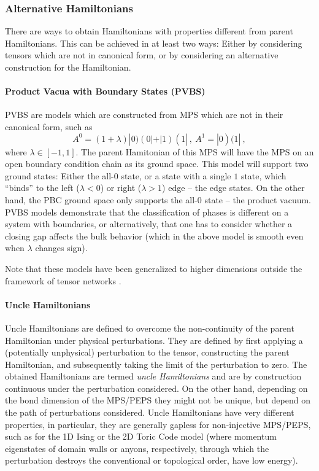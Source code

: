 \documentclass[rmp,aps,reprint,superscriptaddress,nobalancelastpage]{revtex4-1}
\begin{document}
\subsubsection{Alternative Hamiltonians}

There are ways to obtain Hamiltonians with properties different from parent Hamiltonians. This can be achieved in at least two ways: Either by considering tensors which are not in canonical form, or by considering an alternative construction for the Hamiltonian.

\paragraph{Product Vacua with Boundary States (PVBS)}
PVBS \cite{bachmann:pvbs-prb,bachmann:pvbs-cmp} are models which are constructed from MPS which are not in their canonical form, such as
$$
    A^0=(1+\lambda) |0)(0|+|1)(1|\,,\ A^1=|0)(1|\ ,
$$
where $\lambda\in[-1,1]$.
The parent Hamitonian of this MPS will have the MPS on an open boundary condition chain as its ground space.  This model will support two ground states: Either the all-$0$ state, or a state with a single $1$ state, which ``binds'' to the left ($\lambda<0$) or right ($\lambda>1$) edge -- the edge states. On the other hand, the PBC ground space only supports the all-$0$ state -- the product vacuum. PVBS models demonstrate that the classification of phases is different on a system with boundaries, or alternatively, that one has to consider whether a closing gap affects the bulk behavior (which in the above model is smooth even when $\lambda$ changes sign).

Note that these models have been generalized to higher dimensions outside the framework of tensor networks \cite{bachmann:pvbs-higherdim}.


\paragraph{Uncle Hamiltonians}
Uncle Hamiltonians \cite{fernandez:1d-uncle,fernandez-gonzalez:uncle-long} are defined to overcome the non-continuity of the parent Hamiltonian under physical perturbations. They are defined by first applying a
(potentially unphysical) perturbation to the tensor, constructing the parent Hamiltonian, and subsequently taking the limit of the perturbation to zero.  The obtained Hamiltonians are termed \emph{uncle Hamiltonians} and are by construction continuous under the perturbation considered.  On the other hand, depending on the bond dimension of the MPS/PEPS they might not be unique, but depend on the path of perturbations considered.  Uncle Hamiltonians have very different properties, in particular, they are generally gapless for non-injective MPS/PEPS, such as for the 1D Ising or the 2D Toric Code model (where momentum eigenstates of domain walls or anyons, respectively, through which the perturbation destroys the conventional or topological order, have low energy).
\end{document}
